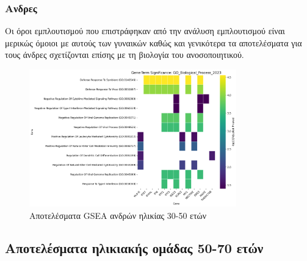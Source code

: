 \documentclass[12pt]{report}
\begin{document}
            \subsubsection{Ανδρες}
                \par
                    Οι όροι εμπλουτισμού που επιστράφηκαν από την ανάλυση εμπλουτισμού είναι μερικώς όμοιοι με αυτούς των γυναικών καθώς και γενικότερα τα αποτελέσματα για τους άνδρες σχετίζονται επίσης με τη βιολογία του ανοσοποιητικού.
                \begin{figure}[H]
                    \centering
                    \includegraphics[width=0.8\textwidth]{GSEA/Males/30-50/gsea_results_Male_30-50_GO_Biological_Process_2023_heatmap.png}
                    \caption{Αποτελέσματα GSEA ανδρών ηλικίας 30-50 ετών}
                    \label{fig:gsea_results_Male_30-50_GO_Biological_Process_2023_heatmap}
                \end{figure}
            \newpage
        \subsection{Αποτελέσματα ηλικιακής ομάδας 50-70 ετών}
\end{document}
